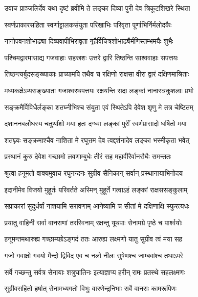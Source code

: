 \twolineshloka
{उवाच प्राञ्जलिर्देव यथा दृष्टं ब्रवीमि ते}
{लङ्का दिव्या पुरी देव त्रिकूटशिखरे स्थिता} %

\twolineshloka
{स्वर्णप्राकारसहिता स्वर्णाट्टालकसंयुता}
{परिखाभिः परिवृता पूर्णाभिर्निर्मलोदकैः} %

\twolineshloka
{नानोपवनशोभाढ्या दिव्यवापीभिरावृता}
{गृहैर्विचित्रशोभाढ्यैर्मणिस्तम्भमयैः शुभैः} %

\twolineshloka
{पश्चिमद्वारमासाद्य गजवाहाः सहस्रशः}
{उत्तरे द्वारि तिष्ठन्ति साश्ववाहाः सपत्तयः} %

\twolineshloka
{तिष्ठन्त्यर्बुदसङ्ख्याकाः प्राच्यामपि तथैव च}
{रक्षिणो राक्षसा वीरा द्वारं दक्षिणमाश्रिताः} %

\twolineshloka
{मध्यकक्षेऽप्यसङ्ख्याता गजाश्वरथपत्तयः}
{रक्षयन्ति सदा लङ्कां नानास्त्रकुशलाः प्रभो} %

\twolineshloka
{सङ्क्रमैर्विविधैर्लङ्का शतघ्नीभिश्च संयुता}
{एवं स्थितेऽपि देवेश शृणु मे तत्र चेष्टितम्} %

\twolineshloka
{दशाननबलौघस्य चतुर्थांशो मया हतः}
{दग्ध्वा लङ्कां पुरीं स्वर्णप्रासादो धर्षितो मया} %

\twolineshloka
{शतघ्न्यः सङ्क्रमाश्चैव नाशिता मे रघूत्तम}
{देव त्वद्दर्शनादेव लङ्का भस्मीकृता भवेत्} %

\twolineshloka
{प्रस्थानं कुरु देवेश गच्छामो लवणाम्बुधेः}
{तीरं सह महावीरैर्वानरौघैः समन्ततः} %

\twolineshloka
{श्रुत्वा हनूमतो वाक्यमुवाच रघुनन्दनः}
{सुग्रीव सैनिकान् सर्वान् प्रस्थानायाभिनोदय} %

\twolineshloka
{इदानीमेव विजयो मुहूर्तः परिवर्तते}
{अस्मिन् मुहूर्ते गत्वाऽहं लङ्कां राक्षससङ्कुलाम्} %

\twolineshloka
{सप्राकारां सुदुर्धर्षां नाशयामि सरावणाम्}
{आनेष्यामि च सीतां मे दक्षिणाक्षि स्फुरत्यधः} %

\twolineshloka
{प्रयातु वाहिनी सर्वा वानराणां तरस्विनाम्}
{रक्षन्तु यूथपाः सेनामग्रे पृष्ठे च पार्श्वयोः} %

\twolineshloka
{हनूमन्तमथारुह्य गच्छाम्यग्रेऽङ्गदं ततः}
{आरुह्य लक्ष्मणो यातु सुग्रीव त्वं मया सह} %

\twolineshloka
{गजो गवाक्षो गवयो मैन्दो द्विविद एव च}
{नलो नीलः सुषेणश्च जाम्बवांश्च तथाऽपरे} %

\twolineshloka
{सर्वे गच्छन्तु सर्वत्र सेनायाः शत्रुघातिनः}
{इत्याज्ञाप्य हरीन् रामः प्रतस्थे सहलक्ष्मणः} %

\twolineshloka
{सुग्रीवसहितो हर्षात् सेनामध्यगतो विभुः}
{वारणेन्द्रनिभाः सर्वे वानराः कामरूपिणः} %

